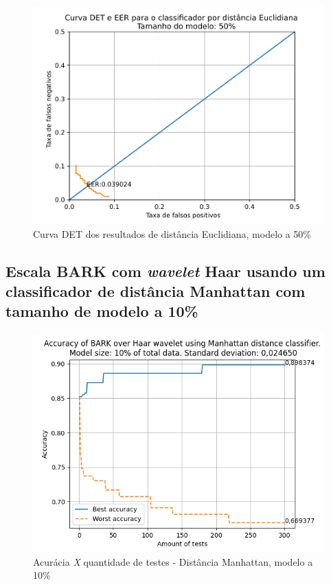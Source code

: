 			\begin{figure}[ht]
				\centering
				\includegraphics[width=\linewidth]{images/results/det/DET_for_classifier_Euclidian_50}
				\caption{Curva DET dos resultados de distância Euclidiana, modelo a 50\%}
				\label{fig:detforclassifiereuclidian50}
			\end{figure}
		
			\forceNewPage
		\subsection{Escala BARK com \textit{wavelet} Haar usando um classificador de distância Manhattan com tamanho de modelo a 10\%}
		
			
	
			\begin{figure}[ht]
				\centering
				\includegraphics[width=\linewidth]{images/results/confusionMatrices/classifier_Manhattan_10.png}
				\caption{Acurácia \textit{X} quantidade de testes - Distância Manhattan, modelo a 10\%}
				\label{fig:classifiermanhattan10}
			\end{figure}
		
